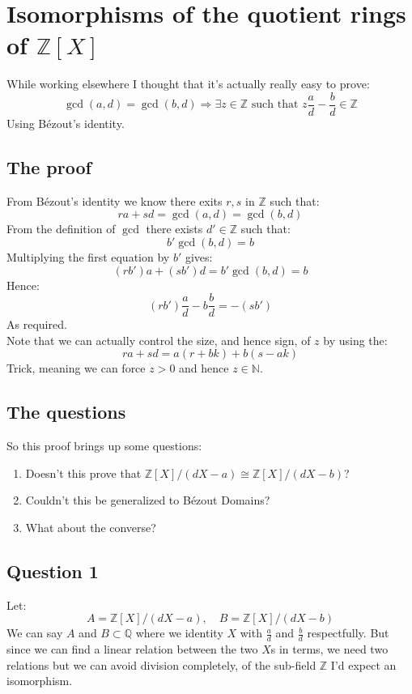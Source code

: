 
\section{Isomorphisms of the quotient rings of $\mathbb{Z}[X]$ }
While working elsewhere I thought that it's actually really easy to prove:
\[\gcd(a,d)=\gcd(b,d) \Rightarrow \exists z \in\mathbb{Z} \text{ such that } z\frac{a}{d}-\frac{b}{d} \in \mathbb{Z}\]
Using Bézout's identity.
\\

\subsection{The proof}
From Bézout's identity we know there exits $r,s$ in $\mathbb{Z}$ such that:
\[ra+sd = \gcd(a,d) = \gcd(b,d)\]
From the definition of $\gcd$ there exists $d'\in\mathbb{Z}$ such that:
\[b'\gcd(b,d) = b\]
Multiplying the first equation by $b'$ gives:
\[(rb')a+(sb')d = b'\gcd(b,d) = b\]
Hence:
\[(rb')\frac{a}{d}-b\frac{b}{d} = -(sb')\]
As required.
\\

Note that we can actually control the size, and hence sign, of $z$ by using the:
\[ra+sd = a(r+bk)+b(s-ak)\]
Trick, meaning we can force $z>0$ and hence $z\in\mathbb{N}$.

\subsection{The questions}
So this proof brings up some questions:
\begin{enumerate}
	\item Doesn't this prove that $\mathbb{Z}[X]/(dX-a) \cong \mathbb{Z}[X]/(dX-b)$?
	\item Couldn't this be generalized to Bézout Domains?
	\item What about the converse?
\end{enumerate}

\subsection{Question 1}
Let:
\[A = \mathbb{Z}[X]/(dX-a),\quad B =\mathbb{Z}[X]/(dX-b)\]
We can say $A$ and $B \subset \mathbb{Q}$ where we identity $X$ with $\frac{a}{d}$ and $\frac{b}{d}$ respectfully. 
But since we can find a linear relation between the two $X$s in terms, we need two relations but we can avoid division completely, of the sub-field $\mathbb{Z}$ I'd expect an isomorphism.
\\

